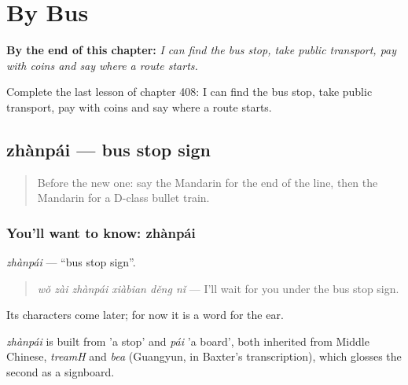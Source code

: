 
\chapter{By Bus}
\label{ch:zh-by-bus}

\begin{chapteropening}
\textbf{By the end of this chapter:} \emph{I can find the bus stop, take public transport, pay with coins and say where a route starts.}

Complete the last lesson of chapter 408: I can find the bus stop, take public transport, pay with coins and say where a route starts.
\end{chapteropening}

\section[zhànpái]{zhànpái — bus stop sign}

\label{lesson:ZH-C408-zhanpai}



\begin{quote}
Before the new one: say the Mandarin for the end of the line, then the Mandarin for a D-class bullet train.
\end{quote}

\subsection*{You'll want to know: zhànpái}
\emph{zhànpái} — \textquotedblleft{}bus stop sign\textquotedblright{}.

\begin{quote}
\emph{wǒ zài zhànpái xiàbian děng nǐ} — I'll wait for you under the bus stop sign.
\end{quote}

Its characters come later; for now it is a word for the ear.

\begin{cousinweb}
\emph{zhànpái} is built from  'a stop' and \emph{pái} 'a board', both inherited from Middle Chinese, \emph{treamH} and \emph{bea} (Guangyun, in Baxter's transcription), which glosses the second as a signboard.
\end{cousinweb}

